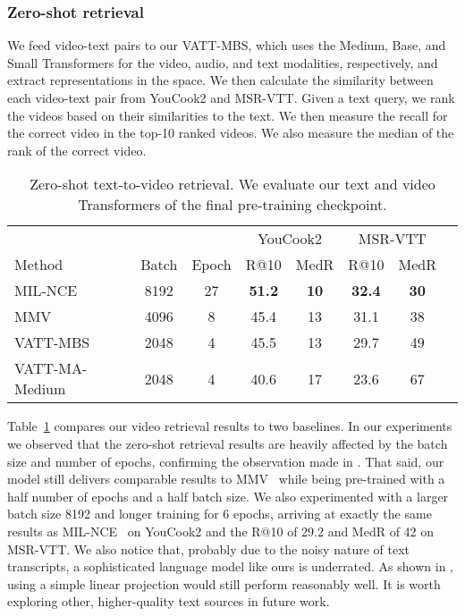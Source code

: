\documentclass[10pt,twocolumn,letterpaper]{article}
\newcommand{\ours}{VATT\xspace}
\begin{document}
\subsubsection{Zero-shot retrieval}
We feed video-text pairs to our VATT-MBS, which uses the Medium, Base, and Small Transformers for the video, audio, and text modalities, respectively, and extract representations in the  space. We then calculate the similarity between each video-text pair from YouCook2 and MSR-VTT. Given a text query, we rank the videos based on their similarities to the text. We then measure the recall for the correct video in the top-10 ranked videos. We also measure the median of the rank of the correct video.
\begin{table}[h!]
    \small
    \centering
    \setlength{\tabcolsep}{1pt}
    \begin{tabular}{@{}lccccccc@{}}
    \toprule
        & & & \multicolumn{2}{c}{YouCook2} &  \multicolumn{2}{c}{MSR-VTT}\\ \cline{4-5} \cline{6-7}
        \sc Method & \sc Batch & \sc Epoch & R@10 & MedR & R@10 & MedR \\
        \midrule
    MIL-NCE ~\cite{miech2020end} & 8192 & 27 & \textbf{51.2} & \textbf{10} & \textbf{32.4} & \textbf{30} \\
    MMV ~\cite{mmv} & 4096 & 8 & 45.4 & 13 & 31.1 & 38 \\
    \midrule
\ours-MBS & 2048 & 4 & 45.5 & 13 & 29.7 & 49 \\
    \midrule
    \ours-MA-Medium & 2048 & 4 & 40.6 & 17 & 23.6 & 67 \\
    \bottomrule
    \end{tabular}
    \vspace{2mm}
    \caption{Zero-shot text-to-video retrieval. We evaluate our text and video Transformers of the final pre-training checkpoint.}
    \label{table:retrieval} 
    \vspace{-2mm}
\end{table} 
Table~\ref{table:retrieval} compares our video retrieval results to two baselines. In our experiments we observed that the zero-shot retrieval results are heavily affected by the batch size and number of epochs, confirming the observation made in \cite{mmv}. That said, our model still delivers comparable results to MMV~\cite{mmv} while being pre-trained with a half number of epochs and a half batch size. We also experimented with a larger batch size 8192 and longer training for 6 epochs, arriving at exactly the same results as MIL-NCE~\cite{miech2020end} on YouCook2 and the R@10 of 29.2 and MedR of 42 on MSR-VTT. We also notice that, probably due to the noisy nature of text transcripts, a sophisticated language model like ours is underrated. As shown in \cite{mmv}, using a simple linear projection would still perform reasonably well. It is worth exploring other, higher-quality text sources in future work.
\end{document}
